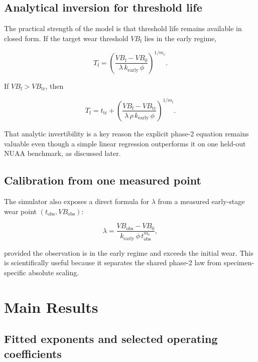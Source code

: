 \documentclass[11pt,a4paper]{article}
\newcommand{\vb}{V\!B}
\newcommand{\vbf}{V\!B_{\mathrm{f}}}
\newcommand{\vbtr}{V\!B_{\mathrm{tr}}}
\newcommand{\ttr}{t_{\mathrm{tr}}}
\newcommand{\phii}{\phi}
\newcommand{\earlyexp}{m_{\mathrm{e}}}
\newcommand{\lateexp}{m_{\mathrm{l}}}
\begin{document}
\subsection{Analytical inversion for threshold life}

The practical strength of the model is that threshold life remains available in closed form.
If the target wear threshold \(\vbf\) lies in the early regime,

\begin{equation}
T_{\mathrm{f}} =
\left(
\frac{\vbf - \vb_0}{\lambda \, k_{\mathrm{early}} \, \phii}
\right)^{1/\earlyexp}.
\label{eq:life-early}
\end{equation}

If \(\vbf > \vbtr\), then

\begin{equation}
T_{\mathrm{f}} = \ttr +
\left(
\frac{\vbf - \vbtr}{\lambda \, \rho \, k_{\mathrm{early}} \, \phii}
\right)^{1/\lateexp}.
\label{eq:life-late}
\end{equation}

That analytic invertibility is a key reason the explicit phase-2 equation remains valuable even though a simple linear
regression outperforms it on one held-out NUAA benchmark, as discussed later.

\subsection{Calibration from one measured point}

The simulator also exposes a direct formula for \(\lambda\) from a measured early-stage wear point
\((t_{\mathrm{obs}}, \vb_{\mathrm{obs}})\):

\begin{equation}
\lambda =
\frac{\vb_{\mathrm{obs}} - \vb_0}
{k_{\mathrm{early}} \, \phii \, t_{\mathrm{obs}}^{\earlyexp}},
\label{eq:lambda}
\end{equation}

provided the observation is in the early regime and exceeds the initial wear.
This is scientifically useful because it separates the shared phase-2 law from specimen-specific absolute scaling.

\section{Main Results}

\subsection{Fitted exponents and selected operating coefficients}
\end{document}
